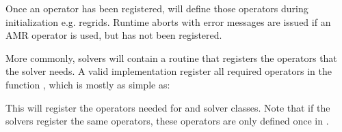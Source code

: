\documentclass[letterpaper,10pt,english]{sphinxmanual}
\begin{document}
Once an operator has been registered,  will define those operators during initialization e.g. regrids.
Run\sphinxhyphen{}time aborts with error messages are issued if an AMR operator is used, but has not been registered.

More commonly,  solvers will contain a routine that registers the operators that the solver needs.
A valid  implementation  register all required operators in the function , which is mostly as simple as:

\begin{sphinxVerbatim}[commandchars=\\\{\},formatcom=\scriptsize]
 
 

 
\end{sphinxVerbatim}

This will register the operators needed for  and  solver classes.
Note that if the solvers register the same operators, these operators are only defined once in {\hyperref[\detokenize{Source/AmrMesh:chap-amrmesh}]{}}.
\end{document}
